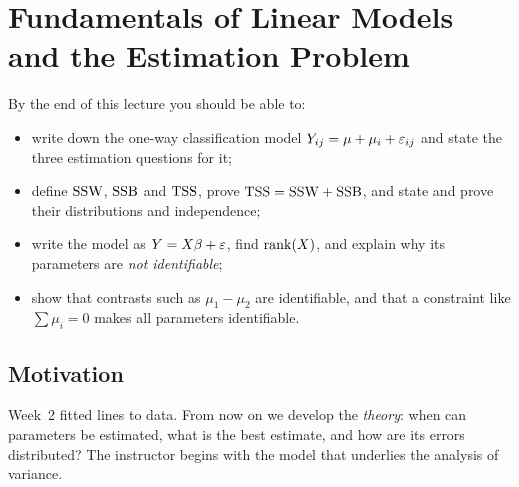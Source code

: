 \section{Fundamentals of Linear Models and the Estimation Problem}\label{sec:L08}


\begin{guiding*}
By the end of this lecture you should be able to:
\begin{itemize}
  \item write down the one-way classification model $Y_{ij}=\mu+\mu_i+\varepsilon_{ij}$ and state the three estimation questions for it;
  \item define $\mathrm{SSW}$, $\mathrm{SSB}$ and $\mathrm{TSS}$, prove $\mathrm{TSS}=\mathrm{SSW}+\mathrm{SSB}$, and state and prove their distributions and independence;
  \item write the model as $Y=X\beta+\varepsilon$, find $\operatorname{rank}(X)$, and explain why its parameters are \emph{not identifiable};
  \item show that contrasts such as $\mu_1-\mu_2$ are identifiable, and that a constraint like $\sum\mu_i=0$ makes all parameters identifiable.
\end{itemize}
\end{guiding*}

\subsection{Motivation}
Week~2 fitted lines to data. From now on we develop the \emph{theory}: when can parameters be
estimated, what is the best estimate, and how are its errors distributed? The instructor begins
with the model that underlies the analysis of variance.

